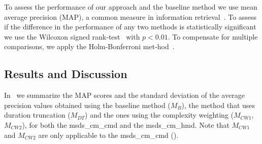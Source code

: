 To assess the performance of our approach and the baseline method we use mean average precision (MAP), a common measure in information retrieval~\citep{manning2008introduction}. To assess if the difference in the performance of any two methods is statistically significant we use the Wilcoxon signed rank-test~\citep{wilcoxon1945individual} with $p < 0.01$. To compensate for multiple comparisons, we apply the Holm-Bonferroni met-hod~\citep{holm1979simple}.


\subsection{Results and Discussion}
\label{sec:patterns_improving_similarity_results_and_discussion}


In~ we summarize the MAP scores and the standard deviation of the average precision values obtained using the baseline method ($M_{B}$), the method that uses duration truncation ($M_{DT}$) and the ones using the complexity weighting ($M_{CW1}$, $M_{CW2}$), for both the \acrshort{msds_cm_cmd} and the \acrshort{msds_cm_hmd}. Note that $M_{CW1}$ and $M_{CW2}$ are only applicable to the \acrshort{msds_cm_cmd} ().


